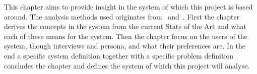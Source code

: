 This chapter aims to provide insight in the system of which this project is based around. The analysis methods used originates from~\cite{mathiassen2001objektorienteret} and~\cite{benyon2013designing}. First the chapter derives the concepts in the system from the current State of the Art and what each of these means for the system. Then the chapter focus on the users of the system, though interviews and persona, and what their preferences are. In the end a specific system definition together with a specific problem definition concludes the chapter and defines the system of which this project will analyse.